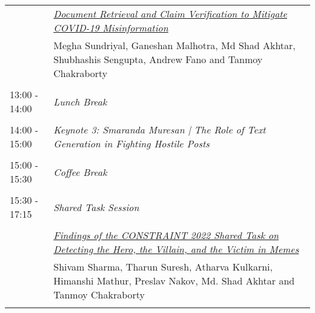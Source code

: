 \documentclass[11pt,oneside]{book}
\begin{document}
\begin{tabular}{p{24mm}p{124mm}}
                      & \hyperlink{page.66}{\emph{Document Retrieval and Claim Verification to Mitigate COVID-19 Misinformation}}\\
        & Megha Sundriyal, Ganeshan Malhotra, Md Shad Akhtar, Shubhashis Sengupta, Andrew Fano and Tanmoy Chakraborty\\\\
                      13:00 - 14:00 & \emph{Lunch Break}\\\\
      
                      14:00 - 15:00 & \emph{Keynote 3: Smaranda Muresan | The Role of Text Generation in Fighting Hostile Posts}\\\\
      
                      15:00 - 15:30 & \emph{Coffee Break}\\\\
      
                      15:30 - 17:15 & \emph{Shared Task Session}\\\\
      
                
                      & \hyperlink{page.1}{\emph{Findings of the CONSTRAINT 2022 Shared Task on Detecting the Hero, the Villain, and the Victim in Memes}}\\
        & Shivam Sharma, Tharun Suresh, Atharva Kulkarni, Himanshi Mathur, Preslav Nakov, Md. Shad Akhtar and Tanmoy Chakraborty\\\\
              \end{tabular}
    \newpage
\end{document}
